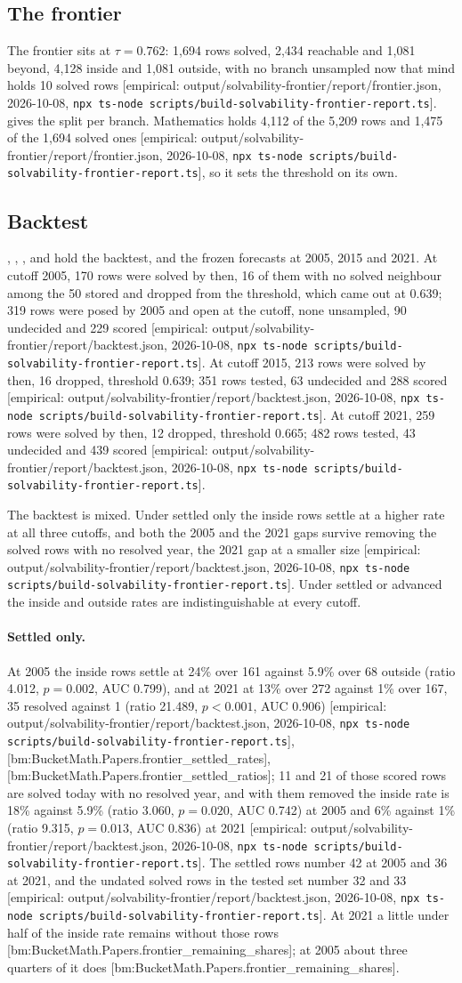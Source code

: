 \documentclass[11pt]{article}
\newcommand{\emp}[1]{\textcolor{bucketgray}{\footnotesize [empirical: #1]}}
\newcommand{\bm}[1]{\textcolor{bucketgray}{\footnotesize [bm:#1]}}
\newcommand{\cmd}{\texttt{npx ts-node scripts/build-solvability-frontier-report.ts}}
\newcommand{\bt}{\emp{output/solvability-frontier/report/backtest.json, 2026-10-08, \cmd}}
\newcommand{\fr}{\emp{output/solvability-frontier/report/frontier.json, 2026-10-08, \cmd}}
\begin{document}
\subsection{The frontier}


The frontier sits at $\tau = 0.762$: 1,694 rows solved, 2,434 reachable and 1,081 beyond, 4,128 inside and 1,081 outside, with no branch unsampled now that mind holds 10 solved rows \fr.  gives the split per branch. Mathematics holds 4,112 of the 5,209 rows and 1,475 of the 1,694 solved ones \fr, so it sets the threshold on its own.

\begin{table}[htbp]
  \centering
  \caption{Rows per branch and zone \fr.}
  \label{tab:branches}
  \small
  
\end{table}

\subsection{Backtest}

, , ,  and  hold the backtest, and  the frozen forecasts at 2005, 2015 and 2021. At cutoff 2005, 170 rows were solved by then, 16 of them with no solved neighbour among the 50 stored and dropped from the threshold, which came out at 0.639; 319 rows were posed by 2005 and open at the cutoff, none unsampled, 90 undecided and 229 scored \bt. At cutoff 2015, 213 rows were solved by then, 16 dropped, threshold 0.639; 351 rows tested, 63 undecided and 288 scored \bt. At cutoff 2021, 259 rows were solved by then, 12 dropped, threshold 0.665; 482 rows tested, 43 undecided and 439 scored \bt.

The backtest is mixed. Under settled only the inside rows settle at a higher rate at all three cutoffs, and both the 2005 and the 2021 gaps survive removing the solved rows with no resolved year, the 2021 gap at a smaller size \bt. Under settled or advanced the inside and outside rates are indistinguishable at every cutoff.

\paragraph{Settled only.}
At 2005 the inside rows settle at 24\% over 161 against 5.9\% over 68 outside (ratio 4.012, $p=0.002$, AUC 0.799), and at 2021 at 13\% over 272 against 1\% over 167, 35 resolved against 1 (ratio 21.489, $p<0.001$, AUC 0.906) \bt, \bm{BucketMath.Papers.frontier\_settled\_rates}, \bm{BucketMath.Papers.frontier\_settled\_ratios}; 11 and 21 of those scored rows are solved today with no resolved year, and with them removed the inside rate is 18\% against 5.9\% (ratio 3.060, $p=0.020$, AUC 0.742) at 2005 and 6\% against 1\% (ratio 9.315, $p=0.013$, AUC 0.836) at 2021 \bt. The settled rows number 42 at 2005 and 36 at 2021, and the undated solved rows in the tested set number 32 and 33 \bt. At 2021 a little under half of the inside rate remains without those rows \bm{BucketMath.Papers.frontier\_remaining\_shares}; at 2005 about three quarters of it does \bm{BucketMath.Papers.frontier\_remaining\_shares}.
\end{document}
